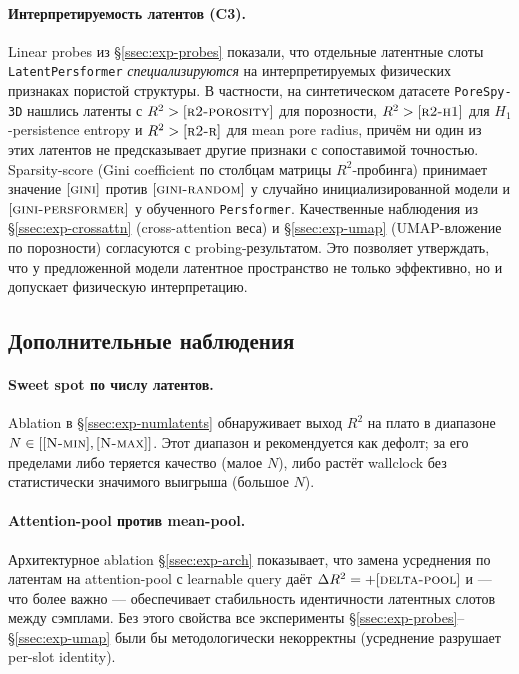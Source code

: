\paragraph{Интерпретируемость латентов (C3).} Linear probes из §\ref{ssec:exp-probes} показали, что отдельные латентные слоты \texttt{LatentPersformer} \emph{специализируются} на интерпретируемых физических признаках пористой структуры. В частности, на синтетическом датасете \texttt{PoreSpy-3D} нашлись латенты с $R^2 > [\textsc{r2-porosity}]$ для порозности, $R^2 > [\textsc{r2-h1}]$ для $H_1$-persistence entropy и $R^2 > [\textsc{r2-r}]$ для mean pore radius, причём ни один из этих латентов не предсказывает другие признаки с сопоставимой точностью. Sparsity-score (Gini coefficient по столбцам матрицы $R^2$-пробинга) принимает значение $[\textsc{gini}]$ против $[\textsc{gini-random}]$ у случайно инициализированной модели и $[\textsc{gini-persformer}]$ у обученного \texttt{Persformer}. Качественные наблюдения из §\ref{ssec:exp-crossattn} (cross-attention веса) и §\ref{ssec:exp-umap} (UMAP-вложение по порозности) согласуются с probing-результатом. Это позволяет утверждать, что у предложенной модели латентное пространство не только эффективно, но и допускает физическую интерпретацию.

\subsection{Дополнительные наблюдения}

\paragraph{Sweet spot по числу латентов.} Ablation в §\ref{ssec:exp-numlatents} обнаруживает выход $R^2$ на плато в диапазоне $N \in [[\textsc{N-min}], [\textsc{N-max}]]$. Этот диапазон и рекомендуется как дефолт; за его пределами либо теряется качество (малое $N$), либо растёт wallclock без статистически значимого выигрыша (большое $N$).

\paragraph{Attention-pool против mean-pool.} Архитектурное ablation §\ref{ssec:exp-arch} показывает, что замена усреднения по латентам на attention-pool с learnable query даёт $\Delta R^2 = +[\textsc{delta-pool}]$ и --- что более важно --- обеспечивает стабильность идентичности латентных слотов между сэмплами. Без этого свойства все эксперименты §\ref{ssec:exp-probes}--§\ref{ssec:exp-umap} были бы методологически некорректны (усреднение разрушает per-slot identity).


